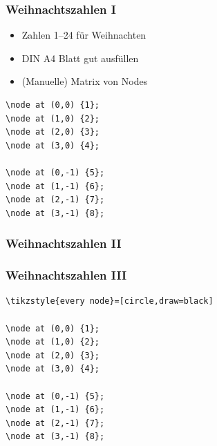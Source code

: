 \documentclass[14pt,ngerman]{beamer}
\begin{document}
\begin{frame}[containsverbatim]
\frametitle{Weihnachtszahlen I}


\begin{itemize}
\item Zahlen 1--24 für Weihnachten
\item DIN A4 Blatt gut ausfüllen
\item (Manuelle) Matrix von Nodes 
\end{itemize}

\begin{lstlisting}
\node at (0,0) {1};
\node at (1,0) {2};
\node at (2,0) {3};
\node at (3,0) {4};

\node at (0,-1) {5};
\node at (1,-1) {6};
\node at (2,-1) {7};
\node at (3,-1) {8};
\end{lstlisting}
\end{frame}

\begin{frame}[containsverbatim]
\frametitle{Weihnachtszahlen II}

\begin{center}
\end{center}

\end{frame}

\begin{frame}[containsverbatim]
\frametitle{Weihnachtszahlen III}


\begin{lstlisting}
\tikzstyle{every node}=[circle,draw=black]

\node at (0,0) {1};
\node at (1,0) {2};
\node at (2,0) {3};
\node at (3,0) {4};

\node at (0,-1) {5};
\node at (1,-1) {6};
\node at (2,-1) {7};
\node at (3,-1) {8};
\end{lstlisting}
\end{frame}
\end{document}
